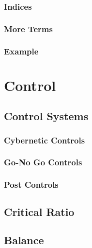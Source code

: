 		\subsection{Indices} %

		\subsection{More Terms} %

		\subsection{Example} %

\chapter{Control} %

	\section{Control Systems} %

		\subsection{Cybernetic Controls} %

		\subsection{Go-No Go Controls} %

		\subsection{Post Controls} %

	\section{Critical Ratio} %

	\section{Balance} %

